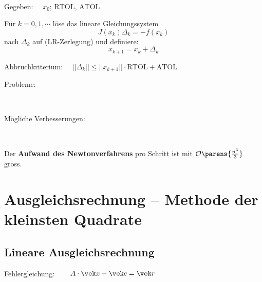 			\begin{algo} ~

				Gegeben: $\quad x_0;\, \mathrm{RTOL},\, \mathrm{ATOL}$

				Für $k=0,1,\cdots$ löse das lineare Gleichungssystem
				\[
					J(x_k) \Delta_k = -f(x_k)
				\]
				nach $\Delta_k$ auf (LR-Zerlegung) und definiere:
				\[
					x_{k+1} = x_k + \Delta_k
				\]

				Abbruchkriterium: $\quad ||\Delta_k|| \leq ||x_{k+1}||\cdot \mathrm{RTOL} + \mathrm{ATOL}$
			\end{algo}

			\begin{description}
				\item[Probleme:] ~
				\item[Mögliche Verbesserungen:] ~
			\end{description}
			Der \textbf{Aufwand des Newtonverfahrens} pro Schritt ist mit $\mathcal{O}\parens{\frac{n^3}{3}}$ gross.

\section{Ausgleichsrechnung -- Methode der kleinsten Quadrate}
	\subsection{Lineare Ausgleichsrechnung}
		Fehlergleichung: $\quad\ \:\: A\cdot \vek x - \vek c = \vek r$

